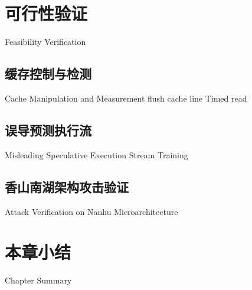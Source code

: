 \section{可行性验证}{Feasibility Verification}
\somewords
\subsection{缓存控制与检测}{Cache Manipulation and Measurement}
flush cache line
Timed read
\subsection{误导预测执行流}{Misleading Speculative Execution Stream}
Training
\subsection{香山南湖架构攻击验证}{Attack Verification on Nanhu Microarchitecture}
\somewords


\section{本章小结}{Chapter Summary}
\somewords


\newpage
